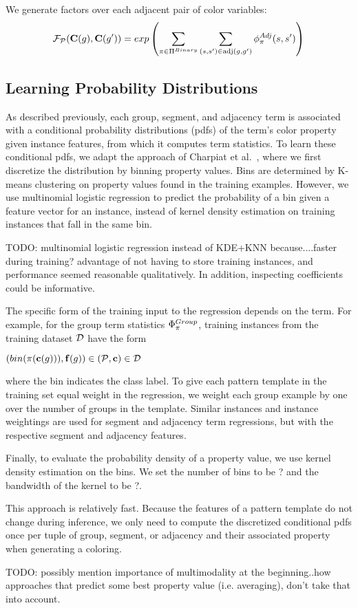  We generate factors over each adjacent pair of color variables:
  \begin{equation*}
 \mathcal{F}_{\mathcal{P}}(\mathbf{C}(g), \mathbf{C}(g^{\prime})) = exp\left(\sum_{\pi \in \Pi^{Binary}}\sum_{(s, s^{\prime}) \in \text{adj}(g, g^{\prime})} \phi^{Adj}_\pi(s, s^{\prime})\right) 
 \end{equation*}


\subsection{Learning Probability Distributions}

As described previously, each group, segment, and adjacency term is associated with a conditional probability distributions (pdfs) of the term's color property given instance features, from which it computes term statistics. To learn these conditional pdfs, we adapt the approach of Charpiat et al.~, where we first discretize the distribution by binning property values. Bins are determined by K-means clustering on property values found in the training examples. However, we use multinomial logistic regression to predict the probability of a bin given a feature vector for an instance, instead of kernel density estimation on training instances that fall in the same bin. 

TODO: multinomial logistic regression instead of KDE+KNN because....faster during training? advantage of not having to store training instances, and performance seemed reasonable qualitatively. In addition, inspecting coefficients could be informative.  

The specific form of the training input to the regression depends on the term. For example, for the group term statistics $\Phi^{Group}_\pi$, training instances from the training dataset $\mathcal{D}$ have the form 

$(bin(\pi(\mathbf{c}(g))), \mathbf{f}(g)) \in (\mathcal{P}, \mathbf{c}) \in \mathcal{D}$ 

where the bin indicates the class label. To give each pattern template in the training set equal weight in the regression, we weight each group example by one over the number of groups in the template. Similar instances and instance weightings are used for segment and adjacency term regressions, but with the respective segment and adjacency features.

Finally, to evaluate the probability density of a property value, we use kernel density estimation on the bins. We set the number of bins to be ? and the bandwidth of the kernel to be ?. 

This approach is relatively fast. Because the features of a pattern template do not change during inference, we only need to compute the discretized conditional pdfs once per tuple of group, segment, or adjacency and their associated property when generating a coloring.


TODO: possibly mention importance of multimodality at the beginning..how approaches that predict some best property value (i.e. averaging), don't take that into account.
